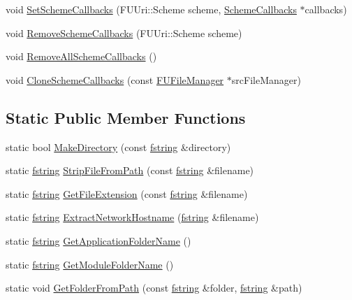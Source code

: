 \begin{DoxyCompactItemize}
\item 
void \hyperlink{classFUFileManager_ac11c2d5dc52fc77d191278c7a4d7f1cb}{SetSchemeCallbacks} (FUUri::Scheme scheme, \hyperlink{structSchemeCallbacks}{SchemeCallbacks} $\ast$callbacks)
\item 
void \hyperlink{classFUFileManager_a879917dc4d7060741678ad4b3dd51f59}{RemoveSchemeCallbacks} (FUUri::Scheme scheme)
\item 
void \hyperlink{classFUFileManager_abc3797d5b03f837e8b27fa5afef61241}{RemoveAllSchemeCallbacks} ()
\item 
void \hyperlink{classFUFileManager_abcbcd32ddfe9aa1342ce0ded2b866b9c}{CloneSchemeCallbacks} (const \hyperlink{classFUFileManager}{FUFileManager} $\ast$srcFileManager)
\end{DoxyCompactItemize}
\subsection*{Static Public Member Functions}
\begin{DoxyCompactItemize}
\item 
static bool \hyperlink{classFUFileManager_ae83f1cf0bc2e618a6f63a61027004894}{MakeDirectory} (const \hyperlink{classfm_1_1stringT}{fstring} \&directory)
\item 
static \hyperlink{classfm_1_1stringT}{fstring} \hyperlink{classFUFileManager_a0f39bebb5c83df44df453f229cde2403}{StripFileFromPath} (const \hyperlink{classfm_1_1stringT}{fstring} \&filename)
\item 
static \hyperlink{classfm_1_1stringT}{fstring} \hyperlink{classFUFileManager_a11d5f66db4b2f0498890fb239fbdc469}{GetFileExtension} (const \hyperlink{classfm_1_1stringT}{fstring} \&filename)
\item 
static \hyperlink{classfm_1_1stringT}{fstring} \hyperlink{classFUFileManager_a058f7610a68c5a7a73bdaf9758bc4878}{ExtractNetworkHostname} (\hyperlink{classfm_1_1stringT}{fstring} \&filename)
\item 
static \hyperlink{classfm_1_1stringT}{fstring} \hyperlink{classFUFileManager_a1888761ae5cb947686d48e62411db2f1}{GetApplicationFolderName} ()
\item 
static \hyperlink{classfm_1_1stringT}{fstring} \hyperlink{classFUFileManager_aacc4070bda728b0326781997756671bc}{GetModuleFolderName} ()
\item 
static void \hyperlink{classFUFileManager_a20cd2e29466d4192fd22942b47ff9873}{GetFolderFromPath} (const \hyperlink{classfm_1_1stringT}{fstring} \&folder, \hyperlink{classfm_1_1stringT}{fstring} \&path)
\end{DoxyCompactItemize}


